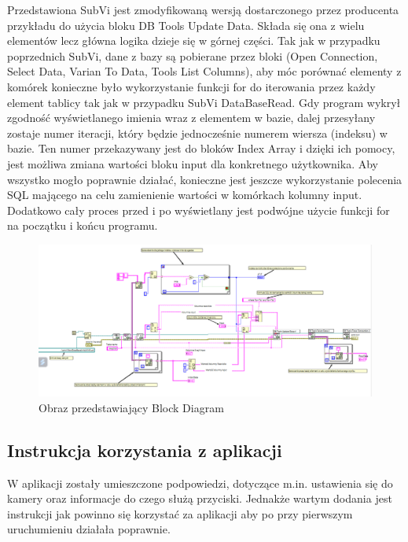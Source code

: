 \documentclass{report}
\begin{document}
Przedstawiona SubVi jest zmodyfikowaną wersją dostarczonego przez producenta przykładu do użycia bloku DB Tools Update Data. Składa się ona z wielu elementów lecz główna logika dzieje się w górnej części.
Tak jak w przypadku poprzednich SubVi, dane z bazy są pobierane przez bloki (Open Connection, Select Data, Varian To Data, Tools List Columns), aby móc porównać elementy z komórek konieczne było wykorzystanie
funkcji for do iterowania przez każdy element tablicy tak jak w przypadku SubVi DataBaseRead. Gdy program wykrył zgodność wyświetlanego imienia wraz z elementem w bazie, dalej przesyłany zostaje numer iteracji,
który będzie jednocześnie numerem wiersza (indeksu) w bazie. Ten numer przekazywany jest do bloków Index Array i dzięki ich pomocy, jest możliwa zmiana wartości bloku input dla konkretnego użytkownika.
Aby wszystko mogło poprawnie działać, konieczne jest jeszcze wykorzystanie polecenia SQL mającego na celu zamienienie wartości w komórkach kolumny input.
Dodatkowo cały proces przed i po wyświetlany jest podwójne użycie funkcji for na początku i końcu programu.

\begin{figure}[H]
    \centering
    \includegraphics[width=1.0\textwidth]{src/Database/Database_update_subvi.png}
    \caption{Obraz przedstawiający Block Diagram}
    \label{fig:first-att}
\end{figure}

\newpage
\subsection{\Large Instrukcja korzystania z aplikacji}

W aplikacji zostały umieszczone podpowiedzi, dotyczące m.in. ustawienia się do kamery oraz informacje do czego służą przyciski. Jednakże wartym dodania jest instrukcji
jak powinno się korzystać za aplikacji aby po przy pierwszym uruchumieniu działała poprawnie. 
\end{document}
